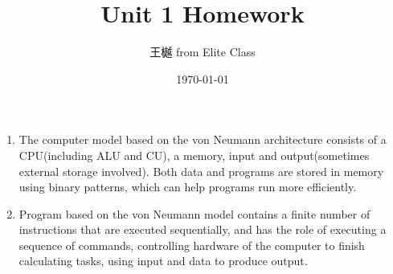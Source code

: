 \documentclass{article}
\begin{document}
    \title{Unit 1 Homework}
    \author{王樾  from Elite Class}
    \date{\today}
    \maketitle

    \begin{enumerate}
        \item The computer model based on the von Neumann architecture consists of a CPU(including ALU and CU), a memory, input and output(sometimes external storage involved). Both data and programs are stored in memory using binary patterns, which can help programs run more efficiently.
        
        \item Program based on the von Neumann model contains a finite number of instructions that are executed sequentially, and has the role of executing a sequence of commands, controlling hardware of the computer to finish calculating tasks, using input and data to produce output.


\end{enumerate}
\end{document}
